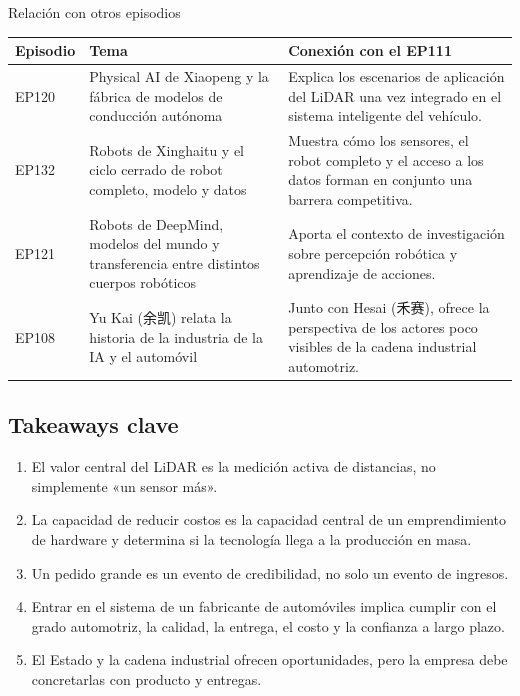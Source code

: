 \begin{knowledgebox}{Relación con otros episodios}
\begin{tabularx}{\textwidth}{p{}p{}X}
\toprule
Episodio & Tema & Conexión con el EP111 \\
\midrule
EP120 & Physical AI de Xiaopeng y la fábrica de modelos de conducción autónoma & Explica los escenarios de aplicación del LiDAR una vez integrado en el sistema inteligente del vehículo. \\
EP132 & Robots de Xinghaitu y el ciclo cerrado de robot completo, modelo y datos & Muestra cómo los sensores, el robot completo y el acceso a los datos forman en conjunto una barrera competitiva. \\
EP121 & Robots de DeepMind, modelos del mundo y transferencia entre distintos cuerpos robóticos & Aporta el contexto de investigación sobre percepción robótica y aprendizaje de acciones. \\
EP108 & Yu Kai (余凯) relata la historia de la industria de la IA y el automóvil & Junto con Hesai (禾赛), ofrece la perspectiva de los actores poco visibles de la cadena industrial automotriz. \\
\bottomrule
\end{tabularx}
\end{knowledgebox}

\subsection{Takeaways clave}

\begin{enumerate}
\item El valor central del LiDAR es la medición activa de distancias, no simplemente «un sensor más».
\item La capacidad de reducir costos es la capacidad central de un emprendimiento de hardware y determina si la tecnología llega a la producción en masa.
\item Un pedido grande es un evento de credibilidad, no solo un evento de ingresos.
\item Entrar en el sistema de un fabricante de automóviles implica cumplir con el grado automotriz, la calidad, la entrega, el costo y la confianza a largo plazo.
\item El Estado y la cadena industrial ofrecen oportunidades, pero la empresa debe concretarlas con producto y entregas.
\end{enumerate}

